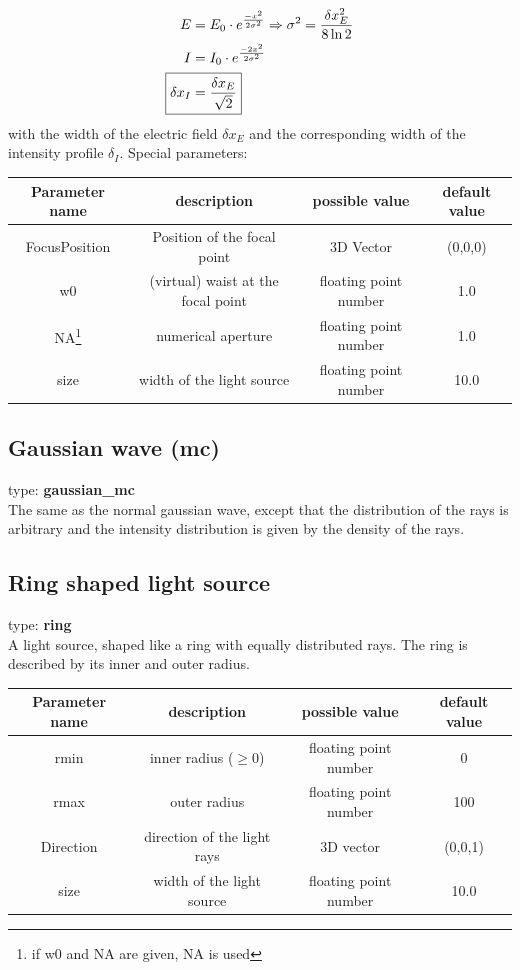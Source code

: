 \documentclass[a4paper,html,11pt,openany]{book}
\begin{document}
\begin{align}
E&=E_0 \cdot e^{\frac{-x^2}{2\sigma^2}} \Rightarrow \sigma^2=\frac{\delta x_E^2}{8\ln2} \\
I&=I_0 \cdot e^{\frac{-2x^2}{2\sigma^2}} \\
\Aboxed {\delta x_I&=\frac{\delta x_E}{\sqrt{2}}}
\end{align}
with the width of the electric field $\delta x_E$ and the corresponding width of the intensity profile $\delta_I$.
\vspace{1em}
Special parameters:

\vspace{1em}
 \begin{tabular}{c|c|c|c}
 Parameter name & description  & possible value & default value\\
 \hline
 FocusPosition & Position of the focal point & 3D Vector & (0,0,0) \\
 \hline
 w0 & (virtual) waist at the focal point & floating point number & 1.0 \\
 \hline
 NA\footnote{if w0 and NA are given, NA is used} & numerical aperture & floating point number & 1.0 \\ 
   \hline
  size & width of the light source  & floating point number & 10.0
 \end{tabular}

\subsection{Gaussian wave (mc)} 
 type: \textbf{gaussian\_mc} \\
The same as the normal gaussian wave, except that the distribution of the rays is arbitrary and the intensity distribution is given by the density of the rays. 

\subsection{Ring shaped light source}
type: \textbf{ring} \\
A light source, shaped like a ring with equally distributed rays. The ring is described by its inner and outer radius. 

\vspace{1em}
 \begin{tabular}{c|c|c|c}
 Parameter name & description  & possible value & default value\\
 \hline
  rmin & inner radius ($\ge 0$) & floating point number & 0 \\
  \hline
  rmax & outer radius  & floating point number & 100 \\
  \hline 
  Direction & direction of the light rays & 3D vector & (0,0,1) \\
    \hline
  size & width of the light source  & floating point number & 10.0\\

\end{tabular} 
 
\end{document}
